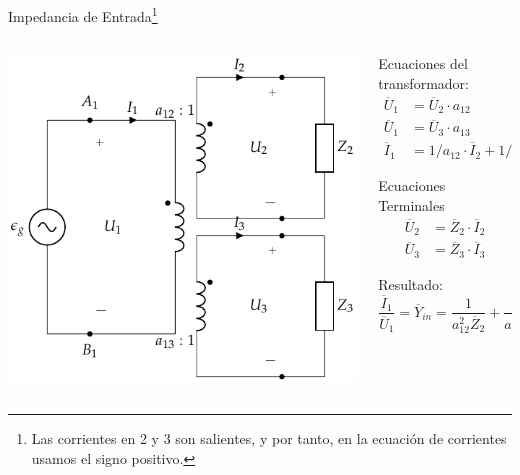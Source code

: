 \documentclass[aspectratio=169, usenames,svgnames,dvipsnames]{beamer}
\begin{document}
\begin{frame}[label={sec:orgaae0b4a}]{Impedancia de Entrada\footnote{Las corrientes en 2 y 3 son salientes, y por tanto, en la ecuación de corrientes usamos el signo positivo.}}
\begin{columns}
\begin{column}{0.4\columnwidth}
\begin{center}
\includegraphics[width=.9\linewidth]{../figs/TrafoIdealVariosDevanados_Impedancia.pdf}
\end{center}
\end{column}

\begin{column}{0.6\columnwidth}
Ecuaciones del transformador:
\begin{align*}
  \overline{U}_1 &= \overline{U}_2 \cdot a_{12}\\
  \overline{U}_1 &= \overline{U}_3 \cdot a_{13}\\
  \overline{I}_1 &= 1/a_{12} \cdot \overline{I}_2 + 1/a_{13} \cdot  \overline{I}_3
\end{align*}

Ecuaciones Terminales
\begin{align*}
  \overline{U}_2 &= \overline{Z}_2 \cdot \overline{I}_2\\
  \overline{U}_3 &= \overline{Z}_3 \cdot \overline{I}_3
\end{align*}

Resultado:
\[
  \frac{\overline{I}_1}{\overline{U}_1} = \boxed{\overline{Y}_{in} = \frac{1}{a^2_{12} \overline{Z}_2} +  \frac{1}{a^2_{13} \overline{Z}_3}}
\]
\end{column}
\end{columns}
\end{frame}
\end{document}
